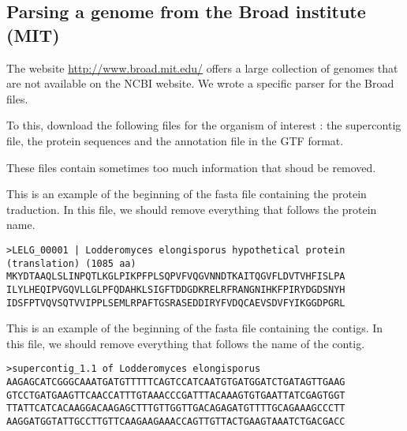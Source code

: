 \subsection{Parsing a genome from the Broad institute (MIT)}

The website \url{http://www.broad.mit.edu/} offers a large collection of
genomes that are not available on the NCBI website. We wrote a specific parser 
for the Broad files.

To this, download the following files for the organism of interest : the supercontig file, the protein sequences and the annotation file in the GTF format.

These files contain sometimes too much information that shoud be removed. 

This is an example of the beginning of the fasta file containing the protein traduction. In this file, we should remove 
everything that follows the protein name.
\begin{footnotesize}
\begin{verbatim}
>LELG_00001 | Lodderomyces elongisporus hypothetical protein (translation) (1085 aa)
MKYDTAAQLSLINPQTLKGLPIKPFPLSQPVFVQGVNNDTKAITQGVFLDVTVHFISLPA
ILYLHEQIPVGQVLLGLPFQDAHKLSIGFTDDGDKRELRFRANGNIHKFPIRYDGDSNYH
IDSFPTVQVSQTVVIPPLSEMLRPAFTGSRASEDDIRYFVDQCAEVSDVFYIKGGDPGRL
\end{verbatim}
\end{footnotesize}
This is an example of the beginning of the fasta file containing the contigs. In this file, we should remove 
everything that follows the name of the contig. 
\begin{footnotesize}
\begin{verbatim}
>supercontig_1.1 of Lodderomyces elongisporus
AAGAGCATCGGGCAAATGATGTTTTTCAGTCCATCAATGTGATGGATCTGATAGTTGAAG
GTCCTGATGAAGTTCAACCATTTGTAAACCCGATTTACAAAGTGTGAATTATCGAGTGGT
TTATTCATCACAAGGACAAGAGCTTTGTTGGTTGACAGAGATGTTTTGCAGAAAGCCCTT
AAGGATGGTATTGCCTTGTTCAAGAAGAAACCAGTTGTTACTGAAGTAAATCTGACGACC
\end{verbatim}
\end{footnotesize}



